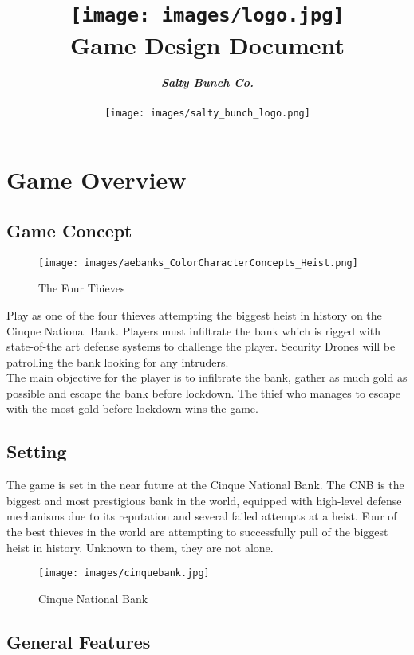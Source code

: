 \documentclass[10pt]{report}
\title{\texttt{[image: images/logo.jpg]}\\\textbf{Game Design Document}}
\author{\textbf{\textit{Salty Bunch Co.}}\\\\\texttt{[image: images/salty\_bunch\_logo.png]}}
\date{}
\begin{document}
\maketitle
\tableofcontents
\listoffigures

\chapter{Game Overview}

\section{Game Concept}

\begin{figure}[H]
    \centering
    \texttt{[image: images/aebanks\_ColorCharacterConcepts\_Heist.png]}
    \caption{The Four Thieves}
\end{figure}

Play as one of the four thieves attempting the biggest heist in history on the Cinque National Bank. Players must infiltrate the bank which is rigged with state-of-the art defense systems to challenge the player. Security Drones will be patrolling the bank looking for any intruders.\\
The main objective for the player is to infiltrate the bank, gather as much gold as possible and escape the bank before lockdown. The thief who manages to escape with the most gold before lockdown wins the game.

\section{Setting}

The game is set in the near future at the Cinque National Bank. The CNB is the biggest and most prestigious bank in the world, equipped with high-level defense mechanisms due to its reputation and several failed attempts at a heist. Four of the best thieves in the world are attempting to successfully pull of the biggest heist in history. Unknown to them, they are not alone.

\begin{figure}[H]
    \centering
    \texttt{[image: images/cinquebank.jpg]}
    \caption{Cinque National Bank}
\end{figure}

\section{General Features}
\end{document}
